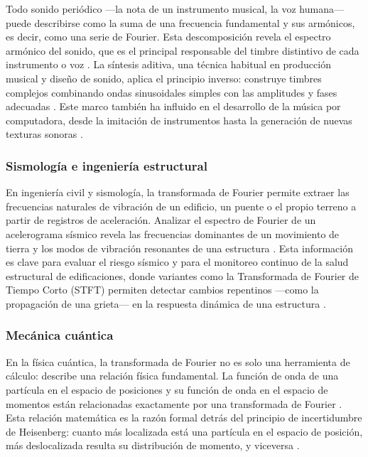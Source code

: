 Todo sonido periódico —la nota de un instrumento musical, la voz humana— puede describirse como la suma de una frecuencia fundamental y sus armónicos, es decir, como una serie de Fourier. Esta descomposición revela el espectro armónico del sonido, que es el principal responsable del timbre distintivo de cada instrumento o voz \cite{hyperphysics:fourier-audio,sebha:fourier-tonos-musicales}. La síntesis aditiva, una técnica habitual en producción musical y diseño de sonido, aplica el principio inverso: construye timbres complejos combinando ondas sinusoidales simples con las amplitudes y fases adecuadas \cite{researchgate:tonos-musicales-fourier,jei:fourier-musica}. Este marco también ha influido en el desarrollo de la música por computadora, desde la imitación de instrumentos hasta la generación de nuevas texturas sonoras \cite{crhy:fourier-musica-computadora}.

\subsubsection{Sismología e ingeniería estructural}

En ingeniería civil y sismología, la transformada de Fourier permite extraer las frecuencias naturales de vibración de un edificio, un puente o el propio terreno a partir de registros de aceleración. Analizar el espectro de Fourier de un acelerograma sísmico revela las frecuencias dominantes de un movimiento de tierra y los modos de vibración resonantes de una estructura \cite{arxiv:sismografo-fourier,sciencedirect:espectro-amplitud-fourier}. Esta información es clave para evaluar el riesgo sísmico y para el monitoreo continuo de la salud estructural de edificaciones, donde variantes como la Transformada de Fourier de Tiempo Corto (STFT) permiten detectar cambios repentinos —como la propagación de una grieta— en la respuesta dinámica de una estructura \cite{pmc:shm-vibraciones}.

\subsubsection{Mecánica cuántica}

En la física cuántica, la transformada de Fourier no es solo una herramienta de cálculo: describe una relación física fundamental. La función de onda de una partícula en el espacio de posiciones y su función de onda en el espacio de momentos están relacionadas exactamente por una transformada de Fourier \cite{libretexts:qm-fourier-113,researchgate:fourier-mecanica-cuantica}. Esta relación matemática es la razón formal detrás del principio de incertidumbre de Heisenberg: cuanto más localizada está una partícula en el espacio de posición, más deslocalizada resulta su distribución de momento, y viceversa \cite{libretexts:qm-fourier-117,researchgate:fourier-mecanica-cuantica}.

